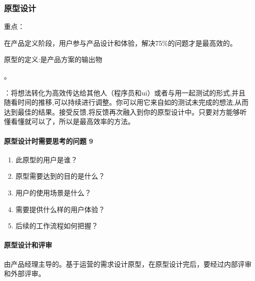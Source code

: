 \documentclass[letterpaper,10pt,english]{sphinxmanual}
\begin{document}
\subsubsection{原型设计}
\label{\detokenize{chapter_knowledge/prototype_design:id1}}\label{\detokenize{chapter_knowledge/prototype_design::doc}}
重点：

在产品定义阶段，用户参与产品设计和体验，解决75\%的问题才是最高效的。

原型的定义:是产品方案的输出物
%
\begin{footnote}[611]\sphinxAtStartFootnote
{}
%
\end{footnote}。

：将想法转化为高效传达给其他人（程序员和ui）或者与用一起测试的形式,并且随看时间的推移,可以持续进行调整。你可以用它来自如的测试未完成的想法,从而达到最佳的结果。接受反馈,将反馈再次融入到你的原型设计中。只要对方能够听懂看懂就可以了，所以是最高效率的方法。


\paragraph{原型设计时需要思考的问题 9\sphinxfootnotemark[612]}
\label{\detokenize{chapter_knowledge/prototype_design:id2}}%
\begin{footnotetext}[612]\sphinxAtStartFootnote
{}
%
\end{footnotetext}\ignorespaces \begin{enumerate}
%
\item {} 
此原型的用户是谁？

\item {} 
原型需要达到的目的是什么？

\item {} 
用户的使用场景是什么？

\item {} 
需要提供什么样的用户体验？

\item {} 
后续的工作流程如何把握？

\end{enumerate}


\paragraph{原型设计和评审}
\label{\detokenize{chapter_knowledge/prototype_design:id3}}
由产品经理主导的。基于运营的需求设计原型，在原型设计完后，要经过内部评审和外部评审。
\end{document}
